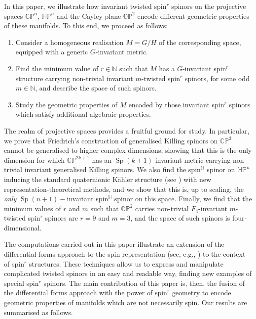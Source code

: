 \documentclass[pdftex]{sigma}
\numberwithin{equation}{section}
\newcommand{\N}{\mathbb{N}} %
\DeclareMathOperator{\Sp}{Sp}
\begin{document}
		In this paper, we illustrate how invariant twisted spin$^r$ spinors on the projective spaces $\mathbb{CP}^n$, $\mathbb{HP}^n$ and the Cayley plane $\mathbb{OP}^2$ encode different geometric properties of these manifolds. To this end, we proceed as follows:
		\begin{enumerate}\itemsep=0pt
			\item[(1)] Consider a homogeneous realisation $M=G/H$ of the corresponding space, equipped with a generic $G$-invariant metric.
			\item[(2)] Find the minimum value of $r\in \N$ such that $M$ has a $G$-invariant spin$^r$ structure carrying non-trivial invariant $m$-twisted spin$^r$ spinors, for some odd $m \in \N$, and describe the space of such spinors.
			\item[(3)] Study the geometric properties of $M$ encoded by those invariant spin$^r$ spinors which satisfy additional algebraic properties.
		\end{enumerate}
		
		The realm of projective spaces provides a fruitful ground for study. In particular, we prove that Friedrich's construction of generalised Killing spinors on $\mathbb{CP}^3$ \cite[p.\ 146]{BFGK} cannot be generalised to higher complex dimensions, showing that this is the only dimension for which $\mathbb{CP}^{2k+1}$ has an $\Sp(k+1)$-invariant metric carrying non-trivial invariant generalised Killing spinors. We also find the spin$^{\mathbb{H}}$ spinor on $\mathbb{HP}^n$ inducing the standard quaternionic K\"{a}hler structure (see \cite[Corollary~4.12]{ES19}) with new representation-theoretical methods, and we show that this is, up to scaling, the \textit{only} $\Sp(n+1)-$invariant spin$^{\mathbb{H}}$ spinor on this space. Finally, we find that the minimum values of $r$ and $m$ such that $\mathbb{OP}^2$ carries non-trivial $F_4$-invariant $m$-twisted spin$^r$ spinors are $r=9$ and $m=3$, and the space of such spinors is four-dimensional.
		
		The computations carried out in this paper illustrate an extension of the differential forms approach to the spin representation (see, e.g., \cite{AHL}) to the context of spin$^r$ structures. These techniques allow us to express and manipulate complicated twisted spinors in an easy and readable way, finding new examples of special spin$^r$ spinors. The main contribution of this paper is, then, the fusion of the differential forms approach with the power of spin$^r$ geometry to encode geometric properties of manifolds which are not necessarily spin. Our results are summarised as follows.
		
\end{document}
